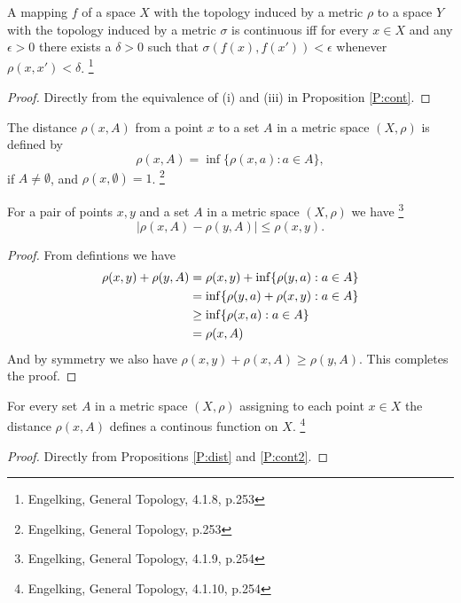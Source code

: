 \begin{proposition} \label{P:cont2}
A mapping $f$ of a space $X$ with the topology induced by a metric $\rho$ to a
space $Y$ with the topology induced by a metric $\sigma$ is continuous iff for
every $x\in X$ and any $\epsilon>0$ there exists a $\delta>0$ such that 
$\sigma(f(x),f(x'))<\epsilon$ whenever $\rho(x,x')<\delta$.
\footnote{Engelking, General Topology, 4.1.8, p.253}
\end{proposition}
\begin{proof}
Directly from the equivalence of (i) and (iii) in Proposition \ref{P:cont}.
\end{proof}


\begin{definition}
The distance $\rho(x,A)$ from a point $x$ to a set $A$ in a metric space
$(X,\rho)$ is defined by
\[
  \rho(x,A)=\inf\{\rho(x,a): a\in A\}, 
\]
if $A\neq \emptyset$, and $\rho(x,\emptyset)=1$.
\footnote{Engelking, General Topology, p.253}
\end{definition}


\begin{proposition} \label{P:dist}
For a pair of points $x,y$ and a set $A$ in a metric space $(X,\rho)$ we have
\footnote{Engelking, General Topology, 4.1.9, p.254}
\[
  |\rho(x,A)-\rho(y,A)|\le \rho(x,y).
\]
\end{proposition}
\begin{proof}
From defintions we have
\begin{align*}
  \rho(x,y) + \rho(y,A) 
    &= \rho(x,y) + \inf\{\rho(y,a): a\in A\}  \notag \\
    &= \inf\{\rho(y,a)+\rho(x,y): a\in A\}  \notag \\
    &\ge \inf\{\rho(x,a): a\in A\}  \notag \\
    &= \rho(x,A) \notag \\
\end{align*}
And by symmetry we also have $\rho(x,y) + \rho(x,A)\ge\rho(y,A)$. 
This completes the proof.
\end{proof}

\begin{theorem} \label{T:dist_cont}
For every set $A$ in a metric space $(X,\rho)$ assigning to each point $x\in X$
the distance $\rho(x,A)$ defines a continous function on $X$.
\footnote{Engelking, General Topology, 4.1.10, p.254}
\end{theorem}
\begin{proof}
Directly from Propositions \ref{P:dist} and \ref{P:cont2}.
\end{proof}


